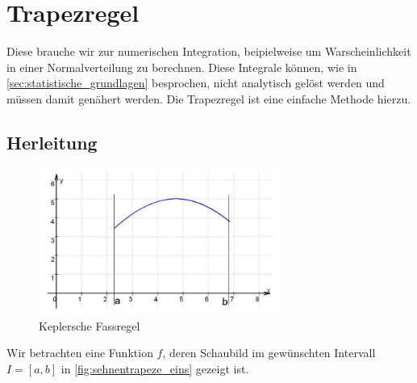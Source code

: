 \section{Trapezregel}
\label{sec:trapezregel}
Diese brauche wir zur numerischen Integration, beipielweise um Warscheinlichkeit in einer Normalverteilung zu berechnen. Diese Integrale können, wie in \autoref{sec:statistische_grundlagen} besprochen, nicht analytisch gelöst werden und müssen damit genähert werden. Die Trapezregel ist eine einfache Methode hierzu.
\subsection{Herleitung}
\label{sec:herleitung}

\begin{figure}[h]
    \centering
    \includegraphics[width=8cm]{Bilder/keplersche_fassregel_funktion.png}
    \caption{Keplersche Fassregel \cite{skript}}    
    \label{fig:keplersche_fassregel}
\end{figure}
Wir betrachten eine Funktion $f$, deren Schaubild im gewünschten Intervall $I = [a, b]$ in \autoref{fig:sehnentrapeze_eins} gezeigt ist.

